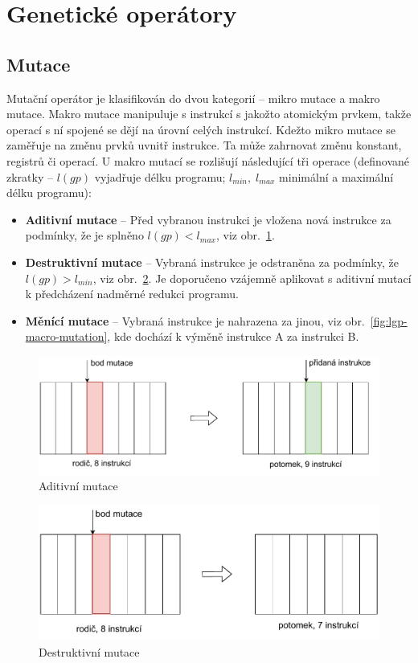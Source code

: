 \section{Genetické operátory}
\subsection{Mutace}
Mutační operátor je klasifikován do dvou kategorií -- mikro mutace a makro mutace. Makro mutace manipuluje s instrukcí s jakožto atomickým prvkem, takže operací s ní spojené se dějí na úrovní celých instrukcí. Kdežto mikro mutace se zaměřuje na změnu prvků uvnitř instrukce. Ta může zahrnovat změnu konstant, registrů či operací. U makro mutací se rozlišují následující tři operace (definované zkratky -- $l(gp)$ vyjadřuje délku programu; $l_{min},\;  l_{max}$ minimální a maximální délku programu):
\begin{itemize}
    \item \textbf{Aditivní mutace} -- Před vybranou instrukci je vložena nová instrukce za podmínky, že je splněno $l(gp) < l_{max}$, viz obr.~\ref{fig:lgp-macro-add-mutation}.
    \item \textbf{Destruktivní mutace} -- Vybraná instrukce je odstraněna za podmínky, že $l(gp) > l_{min}$, viz obr.~\ref{fig:lgp-macro-destructive-mutation}. Je doporučeno vzájemně aplikovat s aditivní mutací k předcházení nadměrné redukci programu.
    \item \textbf{Měnící mutace} -- Vybraná instrukce je nahrazena za jinou, viz obr.~\ref{fig:lgp-macro-mutation}, kde dochází k výměně instrukce A za instrukci B.
\end{itemize}

\begin{figure}[!h]
    \centering
    \includegraphics[scale=0.65]{obrazky-figures/lgp-mut-additive.pdf}
    \caption{Aditivní mutace}
    \label{fig:lgp-macro-add-mutation}
\end{figure}

\begin{figure}[!h]
    \centering
    \includegraphics[scale=0.65]{obrazky-figures/lgp-mut-destructive.pdf}
    \caption{Destruktivní mutace}
    \label{fig:lgp-macro-destructive-mutation}
\end{figure}

